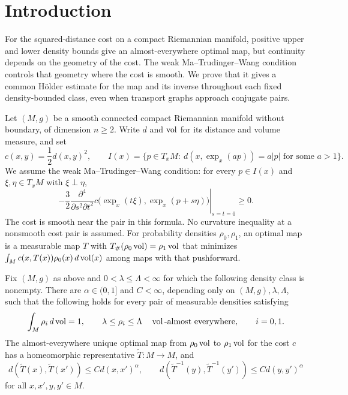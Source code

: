 \section{Introduction}
\label{sec:introduction}

For the squared-distance cost on a compact Riemannian manifold,
positive upper and lower density bounds give an almost-everywhere
optimal map, but continuity depends on the geometry of the cost.
The weak Ma--Trudinger--Wang condition controls that geometry where
the cost is smooth. We prove that it gives a common H\"older estimate
for the map and its inverse throughout each fixed density-bounded
class, even when transport graphs approach conjugate pairs.

Let $(M,g)$ be a smooth connected compact Riemannian manifold without
boundary, of dimension $n\geq2$. Write $d$ and $\operatorname{vol}$ for its distance
and volume measure, and set
\[
 c(x,y)=\frac12d(x,y)^2,\qquad
 I(x)=\{p\in T_xM:\ d(x,\exp_x(ap))=a|p|
                         \text{ for some }a>1\}.
\]
We assume the weak Ma--Trudinger--Wang condition: for every
$p\in I(x)$ and $\xi,\eta\in T_xM$ with $\xi\perp\eta$,
\begin{equation}\label{eq:weak-mtw}
 -\frac32\left.\frac{\partial^4}{\partial s^2\partial t^2}
 c\bigl(\exp_x(t\xi),\exp_x(p+s\eta)\bigr)\right|_{s=t=0}\geq0.
\end{equation}
The cost is smooth near the pair in this formula. No curvature
inequality at a nonsmooth cost pair is assumed.
For probability densities $\rho_0,\rho_1$, an optimal map is a
measurable map $T$ with $T_\#(\rho_0\operatorname{vol})=\rho_1\operatorname{vol}$ that minimizes
$\int_M c(x,T(x))\rho_0(x)\,d\operatorname{vol}(x)$ among maps with that pushforward.

\begin{theorem}\label{thm:main}
Fix $(M,g)$ as above and $0<\lambda\leq\Lambda<\infty$ for which the
following density class is nonempty. There are
$\alpha\in(0,1]$ and $C<\infty$, depending only on
$(M,g),\lambda,\Lambda$, such that the following holds for every pair
of measurable densities satisfying
\[
 \int_M\rho_i\,d\operatorname{vol}=1,\qquad
 \lambda\leq\rho_i\leq\Lambda\quad\operatorname{vol}\text{-almost everywhere},
 \qquad i=0,1.
\]
The almost-everywhere unique optimal map from $\rho_0\operatorname{vol}$ to
$\rho_1\operatorname{vol}$ for the cost $c$ has a homeomorphic representative
$\widetilde T:M\to M$, and
\[
 d(\widetilde T(x),\widetilde T(x'))\leq C d(x,x')^\alpha,
 \qquad
 d(\widetilde T^{-1}(y),\widetilde T^{-1}(y'))
       \leq C d(y,y')^\alpha
\]
for all $x,x',y,y'\in M$.
\end{theorem}

